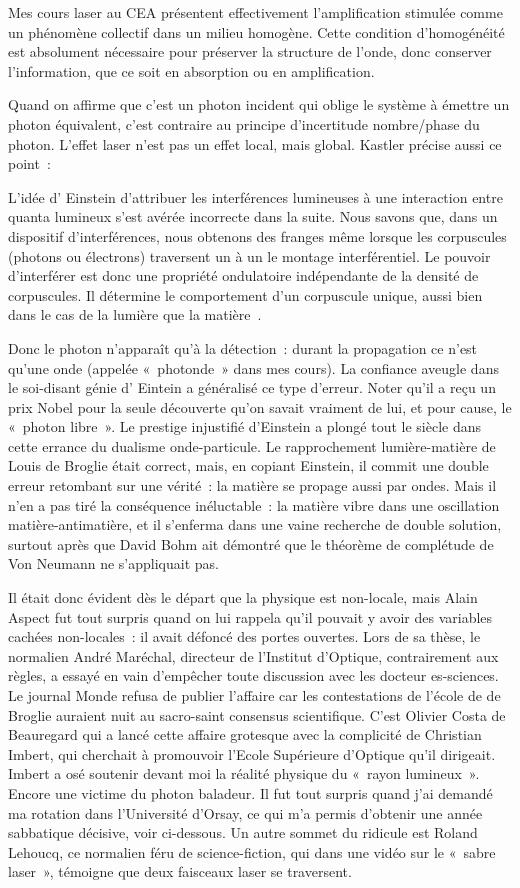 \documentclass[a4paper,12pt]{article}
\begin{document}
Mes cours laser au CEA présentent effectivement l'amplification stimulée comme un phénomène collectif dans un milieu homogène. Cette condition d'homogénéité est absolument nécessaire pour préserver la structure de l'onde, donc conserver l'information, que ce soit en absorption ou en amplification.

Quand on affirme que c'est un photon incident qui oblige le système à émettre un photon équivalent, c'est contraire au principe d'incertitude nombre/phase du photon. L'effet laser n'est pas un effet local, mais global. Kastler précise aussi ce point :

L'idée d' Einstein d'attribuer les interférences lumineuses à une interaction entre quanta lumineux s'est avérée incorrecte dans la suite. Nous savons que, dans un dispositif d'interférences, nous obtenons des franges même lorsque les corpuscules (photons ou électrons) traversent un à un le montage interférentiel. Le pouvoir d'interférer est donc une propriété ondulatoire indépendante de la densité de corpuscules. Il détermine le comportement d'un corpuscule unique, aussi bien dans le cas de la lumière que la matière .

Donc le photon n'apparaît qu'à la détection : durant la propagation ce n'est qu'une onde (appelée « photonde » dans mes cours). La confiance aveugle dans le soi-disant génie d' Eintein a généralisé ce type d'erreur. Noter qu'il a reçu un prix Nobel pour la seule découverte qu'on savait vraiment de lui, et pour cause, le « photon libre ». Le prestige injustifié d'Einstein a plongé tout le siècle dans cette errance du dualisme onde-particule. Le rapprochement lumière-matière de Louis de Broglie était correct, mais, en copiant Einstein, il commit une double erreur retombant sur une vérité : la matière se propage aussi par ondes. Mais il n'en a pas tiré la conséquence inéluctable : la matière vibre dans une oscillation matière-antimatière, et il s'enferma dans une vaine recherche de double solution, surtout après que David Bohm ait démontré que le théorème de complétude de Von Neumann ne s'appliquait pas.

Il était donc évident dès le départ que la physique est non-locale, mais Alain Aspect fut tout surpris quand on lui rappela qu'il pouvait y avoir des variables cachées non-locales : il avait défoncé des portes ouvertes. Lors de sa thèse, le normalien André Maréchal, directeur de l'Institut d'Optique, contrairement aux règles, a essayé en vain d'empêcher toute discussion avec les docteur es-sciences. Le journal Monde refusa de publier l'affaire car les contestations de l'école de de Broglie auraient nuit au sacro-saint consensus scientifique. C'est Olivier Costa de Beauregard qui a lancé cette affaire grotesque avec la complicité de Christian Imbert, qui cherchait à promouvoir l'Ecole Supérieure d'Optique qu'il dirigeait. Imbert a osé soutenir devant moi la réalité physique du « rayon lumineux ». Encore une victime du photon baladeur. Il fut tout surpris quand j'ai demandé ma rotation dans l'Université d'Orsay, ce qui m'a permis d'obtenir une année sabbatique décisive, voir ci-dessous. Un autre sommet du ridicule est Roland Lehoucq, ce normalien féru de science-fiction, qui dans une vidéo sur le « sabre laser », témoigne que deux faisceaux laser se traversent.
\end{document}

